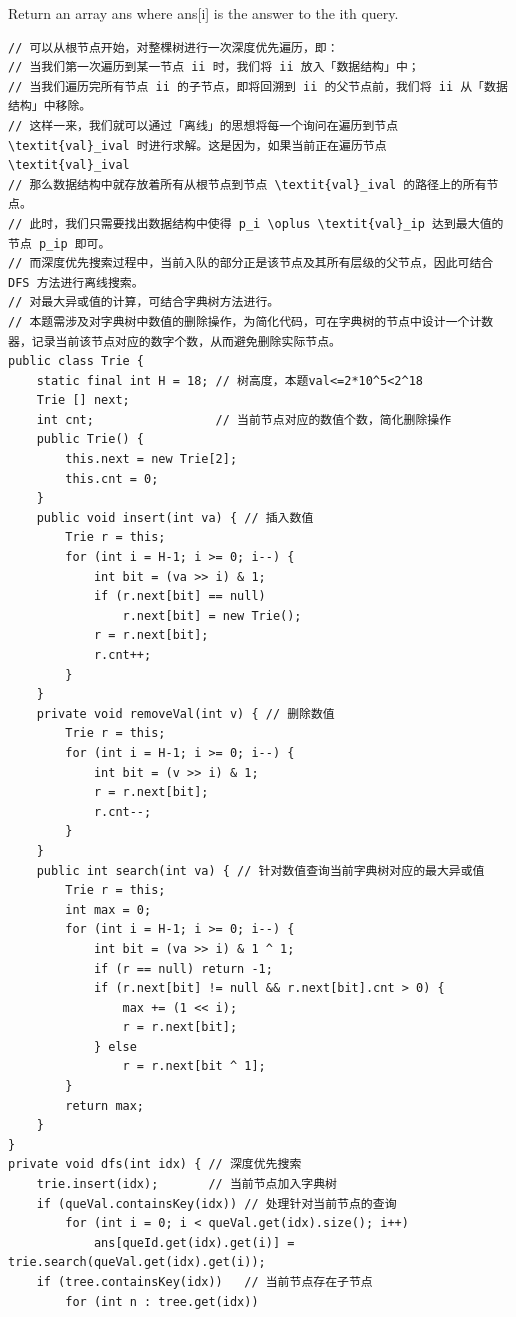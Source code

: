 \documentclass[9pt, b5paaper]{book}
\begin{document}
Return an array ans where ans[i] is the answer to the ith query.
\begin{verbatim}
// 可以从根节点开始，对整棵树进行一次深度优先遍历，即：
// 当我们第一次遍历到某一节点 ii 时，我们将 ii 放入「数据结构」中；
// 当我们遍历完所有节点 ii 的子节点，即将回溯到 ii 的父节点前，我们将 ii 从「数据结构」中移除。
// 这样一来，我们就可以通过「离线」的思想将每一个询问在遍历到节点 \textit{val}_ival 时进行求解。这是因为，如果当前正在遍历节点 \textit{val}_ival
// 那么数据结构中就存放着所有从根节点到节点 \textit{val}_ival 的路径上的所有节点。
// 此时，我们只需要找出数据结构中使得 p_i \oplus \textit{val}_ip 达到最大值的节点 p_ip 即可。
// 而深度优先搜索过程中，当前入队的部分正是该节点及其所有层级的父节点，因此可结合 DFS 方法进行离线搜索。
// 对最大异或值的计算，可结合字典树方法进行。
// 本题需涉及对字典树中数值的删除操作，为简化代码，可在字典树的节点中设计一个计数器，记录当前该节点对应的数字个数，从而避免删除实际节点。
public class Trie {
    static final int H = 18; // 树高度，本题val<=2*10^5<2^18
    Trie [] next;
    int cnt;                 // 当前节点对应的数值个数，简化删除操作
    public Trie() {
        this.next = new Trie[2];
        this.cnt = 0;
    }
    public void insert(int va) { // 插入数值
        Trie r = this;
        for (int i = H-1; i >= 0; i--) {
            int bit = (va >> i) & 1;
            if (r.next[bit] == null) 
                r.next[bit] = new Trie();
            r = r.next[bit];
            r.cnt++;
        }
    }
    private void removeVal(int v) { // 删除数值
        Trie r = this;
        for (int i = H-1; i >= 0; i--) {
            int bit = (v >> i) & 1;
            r = r.next[bit];
            r.cnt--;
        }
    }
    public int search(int va) { // 针对数值查询当前字典树对应的最大异或值
        Trie r = this;
        int max = 0;
        for (int i = H-1; i >= 0; i--) {
            int bit = (va >> i) & 1 ^ 1;
            if (r == null) return -1;
            if (r.next[bit] != null && r.next[bit].cnt > 0) {
                max += (1 << i);
                r = r.next[bit];
            } else
                r = r.next[bit ^ 1];
        }
        return max;
    }
}
private void dfs(int idx) { // 深度优先搜索
    trie.insert(idx);       // 当前节点加入字典树
    if (queVal.containsKey(idx)) // 处理针对当前节点的查询
        for (int i = 0; i < queVal.get(idx).size(); i++) 
            ans[queId.get(idx).get(i)] = trie.search(queVal.get(idx).get(i));
    if (tree.containsKey(idx))   // 当前节点存在子节点
        for (int n : tree.get(idx)) 

\end{verbatim}
\end{document}
